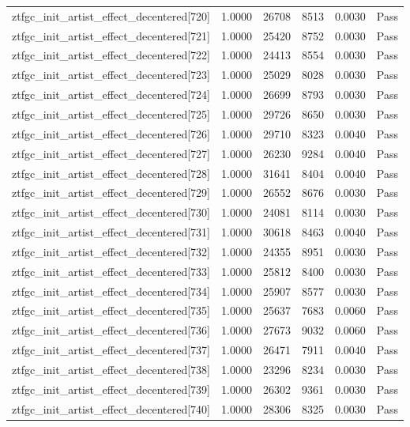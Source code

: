 \begin{table}[htbp]
\begin{tabular}{llrrll}
ztfgc\_init\_artist\_effect\_decentered[720] & 1.0000 & 26708 & 8513 & 0.0030 & Pass \\
ztfgc\_init\_artist\_effect\_decentered[721] & 1.0000 & 25420 & 8752 & 0.0030 & Pass \\
ztfgc\_init\_artist\_effect\_decentered[722] & 1.0000 & 24413 & 8554 & 0.0030 & Pass \\
ztfgc\_init\_artist\_effect\_decentered[723] & 1.0000 & 25029 & 8028 & 0.0030 & Pass \\
ztfgc\_init\_artist\_effect\_decentered[724] & 1.0000 & 26699 & 8793 & 0.0030 & Pass \\
ztfgc\_init\_artist\_effect\_decentered[725] & 1.0000 & 29726 & 8650 & 0.0030 & Pass \\
ztfgc\_init\_artist\_effect\_decentered[726] & 1.0000 & 29710 & 8323 & 0.0040 & Pass \\
ztfgc\_init\_artist\_effect\_decentered[727] & 1.0000 & 26230 & 9284 & 0.0040 & Pass \\
ztfgc\_init\_artist\_effect\_decentered[728] & 1.0000 & 31641 & 8404 & 0.0040 & Pass \\
ztfgc\_init\_artist\_effect\_decentered[729] & 1.0000 & 26552 & 8676 & 0.0030 & Pass \\
ztfgc\_init\_artist\_effect\_decentered[730] & 1.0000 & 24081 & 8114 & 0.0030 & Pass \\
ztfgc\_init\_artist\_effect\_decentered[731] & 1.0000 & 30618 & 8463 & 0.0040 & Pass \\
ztfgc\_init\_artist\_effect\_decentered[732] & 1.0000 & 24355 & 8951 & 0.0030 & Pass \\
ztfgc\_init\_artist\_effect\_decentered[733] & 1.0000 & 25812 & 8400 & 0.0030 & Pass \\
ztfgc\_init\_artist\_effect\_decentered[734] & 1.0000 & 25907 & 8577 & 0.0030 & Pass \\
ztfgc\_init\_artist\_effect\_decentered[735] & 1.0000 & 25637 & 7683 & 0.0060 & Pass \\
ztfgc\_init\_artist\_effect\_decentered[736] & 1.0000 & 27673 & 9032 & 0.0060 & Pass \\
ztfgc\_init\_artist\_effect\_decentered[737] & 1.0000 & 26471 & 7911 & 0.0040 & Pass \\
ztfgc\_init\_artist\_effect\_decentered[738] & 1.0000 & 23296 & 8234 & 0.0030 & Pass \\
ztfgc\_init\_artist\_effect\_decentered[739] & 1.0000 & 26302 & 9361 & 0.0030 & Pass \\
ztfgc\_init\_artist\_effect\_decentered[740] & 1.0000 & 28306 & 8325 & 0.0030 & Pass \\

\end{tabular}
\end{table}
